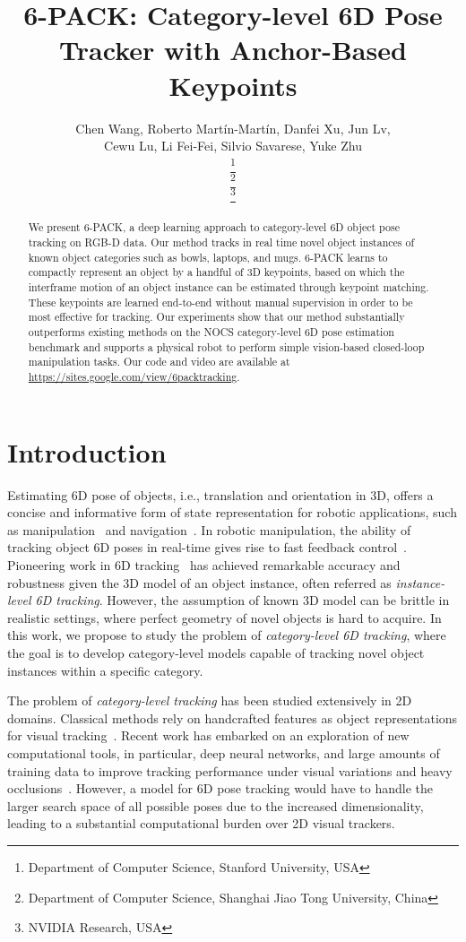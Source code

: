 \documentclass[letterpaper, 10 pt, conference]{ieeeconf}
\title{\LARGE \bf
\textsc{6-PACK}: Category-level 6D Pose Tracker with Anchor-Based Keypoints
}
\author{Chen Wang, Roberto Mart\'{i}n-Mart\'{i}n, Danfei Xu, Jun Lv, \\ Cewu Lu, Li Fei-Fei, Silvio Savarese, Yuke Zhu \\
\thanks{Department of Computer Science, Stanford University, USA} \\
\thanks{Department of Computer Science, Shanghai Jiao Tong University, China} \\
\thanks{NVIDIA Research, USA}
}
\newcommand{\methodname}{\textsc{6-PACK}\xspace}
\begin{document}
\maketitle
\thispagestyle{empty}
\pagestyle{empty}
\vspace{-6mm}

\begin{abstract}
We present \methodname{}, a deep learning approach to category-level 6D object pose tracking on RGB-D data. Our method tracks in real time novel object instances of known object categories such as bowls, laptops, and mugs. \methodname{} learns to compactly represent an object by a handful of 3D keypoints, based on which the interframe motion of an object instance can be estimated through keypoint matching. These keypoints are learned end-to-end without manual supervision in order to be most effective for tracking. Our experiments show that our method substantially outperforms existing methods on the NOCS category-level 6D pose estimation benchmark and supports a physical robot to perform simple vision-based closed-loop manipulation tasks. Our code and video are available at \url{https://sites.google.com/view/6packtracking}.
\end{abstract}

\section{Introduction}

Estimating 6D pose of objects, i.e., translation and orientation in 3D, offers a concise and informative form of state representation for robotic applications, such as manipulation~\cite{GarciaCifuentes.RAL,schmidt2014dart,kappler2018real} and navigation~\cite{xu2017pointfusion,qi2018frustum,3dop}. In robotic manipulation, the ability of tracking object 6D poses in real-time gives rise to fast feedback control~\cite{kappler2018real}. Pioneering work in 6D tracking~\cite{azad20116,schmidt2014dart} has achieved remarkable accuracy and robustness given the 3D model of an object instance, often referred as \emph{instance-level 6D tracking}. However, the assumption of known 3D model can be brittle in realistic settings, where perfect geometry of novel objects is hard to acquire. In this work, we propose to study the problem of \emph{category-level 6D tracking}, where the goal is to develop category-level models capable of tracking novel object instances within a specific category.

The problem of \emph{category-level tracking} has been studied extensively in 2D domains. Classical methods rely on handcrafted features as object representations for visual tracking~\cite{yilmaz2006object,kalal2011tracking,henriques2014high}. Recent work has embarked on an exploration of new computational tools, in particular, deep neural networks, and large amounts of training data to improve tracking performance under visual variations and heavy occlusions~\cite{ondruska2016deep,held2016learning}. However, a model for 6D pose tracking would have to handle the larger search space of all possible poses due to the increased dimensionality, leading to a substantial computational burden over 2D visual trackers.
\end{document}

